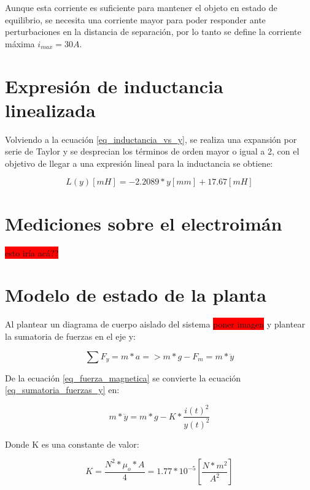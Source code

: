 \noindent Aunque esta corriente es suficiente para mantener el objeto en estado de equilibrio, se necesita una corriente mayor para poder responder ante perturbaciones en la distancia de separación, por lo tanto se define la corriente máxima $i_{max}=30A$.



\section{Expresión de inductancia linealizada}

\noindent Volviendo a la ecuación \ref{eq_inductancia_vs_y}, se realiza una expansión por serie de Taylor y se desprecian los términos de orden mayor o igual a 2, con el objetivo de llegar a una expresión lineal para la inductancia se obtiene:

\begin{equation} \label{eq_inductancia_lineal_teorica}
	L(y)[mH]=-2.2089*y[mm]+17.67 [mH]
\end{equation}

\section{Mediciones sobre el electroimán}

\colorbox{red}{esto iría acá??}

\section{Modelo de estado de la planta}

\noindent Al plantear un diagrama de cuerpo aislado del sistema \colorbox{red}{poner imagen} y plantear la sumatoria de fuerzas en el eje y:

\begin{equation}\label{eq_sumatoria_fuerzas_y}
	\sum F_{y}=m*a=>m*g-F_{m}=m*\ddot{y}
\end{equation}

\noindent De la ecuación \ref{eq_fuerza_magnetica} se convierte la ecuación \ref{eq_sumatoria_fuerzas_y} en:

\begin{equation}\label{eq_sumatoria_fuerzas_y_2}
	m*\ddot{y}=m*g-K*\frac{i(t)^{2}}{y(t)^{2}}
\end{equation}

\noindent Donde K es una constante de valor:

\begin{equation}
	K=\frac{N^{2}*\mu_{o}*A}{4}=1.77*10^{-5} [\frac{N*m^2}{A^2}]
\end{equation}

